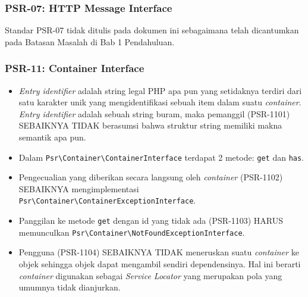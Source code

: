 \subsubsection{PSR-07: HTTP Message Interface}
\label{subsubsec:psr07}
Standar PSR-07 tidak ditulis pada dokumen ini sebagaimana telah dicantumkan pada Batasan Masalah di Bab 1 Pendahuluan.
\begin{comment}
\begin{itemize}
	\item Pesan HTTP dapat berupa permintaan dari klien ke server atau respons dari server ke klien.
	\item MUST
	\item SHOULD
	\item Selama konstruksi, implementasi HARUS berusaha menyetel header  \verb|Host| dari URI yang disediakan jika tidak ada header \verb|Host| yang tersedia.
	\item Klien HTTP HARUS mengabaikan nilai dari \verb|Uri::getPath()| dan \verb|Uri::getQuery()|, sebaliknya menggunakan nilai yang dikembalikan oleh \verb|getRequestTarget()|, yang secara default menggabungkan kedua nilai ini.
	\item Klien yang memilih untuk tidak mengimplementasi 1 atau lebih dari 4 formulir \textit{request-target}, HARUS tetap menggunakan \verb|RequestTarget()|. Klien-klien ini HARUS menolak \textit{request-target} yang tidak mereka dukung, dan DILARANG kembali ke nilai dari \verb|getUri()|.
\end{itemize}
\end{comment}

\subsubsection{PSR-11: Container Interface}
\label{subsubsec:psr11}
\begin{itemize}
	\item \textit{Entry identifier} adalah string legal PHP apa pun yang setidaknya terdiri dari satu karakter unik yang mengidentifikasi sebuah item dalam suatu \textit{container}. \textit{Entry identifier} adalah sebuah string buram, maka pemanggil (PSR-1101) SEBAIKNYA TIDAK berasumsi bahwa struktur string memiliki makna semantik apa pun.
	\item Dalam \verb|Psr\Container\ContainerInterface| terdapat 2 metode: \verb|get| dan \verb|has|.
	\item Pengecualian yang diberikan secara langsung oleh \textit{container} (PSR-1102) SEBAIKNYA mengimplementasi \verb|Psr\Container\ContainerExceptionInterface|.
	\item Panggilan ke metode \verb|get| dengan id yang tidak ada (PSR-1103) HARUS memunculkan \verb|Psr\Container\NotFoundExceptionInterface|.
	\item Pengguna (PSR-1104) SEBAIKNYA TIDAK meneruskan suatu \textit{container} ke objek sehingga objek dapat mengambil sendiri dependensinya. Hal ini berarti \textit{container} digunakan sebagai \textit{Service Locator} yang merupakan pola yang umumnya tidak dianjurkan.
\end{itemize}

